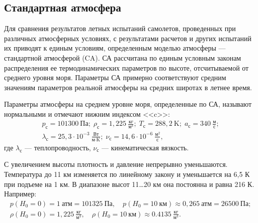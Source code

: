 	\subsection{Стандартная атмосфера}
	Для сравнения результатов летных испытаний самолетов, проведенных при различных атмосферных условиях, с результатами расчетов и других испытаний их приводят к единым условиям, определенным моделью атмосферы --- стандартной атмосферой (CA). СА рассчитана по единым условным законам распределения ее термодинамических параметров по высоте, отсчитываемой от среднего уровня моря. Параметры СА примерно соответствуют средним значениям параметров реальной атмосферы на средних широтах в летнее время.\par
	Параметры атмосферы на среднем уровне моря, определенные по СА, называют нормальными и отмечают нижним индексом <<c>>:
	\begin{gather*}
		p_\text{с}=101300\:\text{Па};\; \rho_\text{с}=1,225\:\frac{\text{кг}}{\text{м}^3};\; T_\text{с}=288,2\:\text{K};\; a_\text{с}=340\:\frac{\text{м}}{\text{с}};\\ \lambda_\text{с}=25,3\cdot10^{-3}\:\frac{\text{Вт}}{\text{м}\cdot\text{K}};\; \nu_\text{с}=14,6\cdot10^{-6}\:\frac{\text{м}^2}{\text{с}},
	\end{gather*}
	где $\lambda_\text{с}$ --- теплопроводность, $\nu_\text{с}$ --- кинематическая вязкость.\par
	С увеличением высоты плотность и давление непрерывно уменьшаются. Температура до 11 км изменяется по линейному закону и уменьшается на 6,5 К при подъеме на 1 км. В диапазоне высот 11\dots20 км она постоянна и равна 216 К. Например:
	\begin{gather*}
		p\left(H_0=0\right)=1\:\text{атм}=101325\:\text{Па},\quad
		p\left(H_0=10\:\text{км}\right)\approx0,265\:\text{атм}=26500\:\text{Па};\\
		\rho\left(H_0=0\right)=1,225\:\frac{\text{кг}}{\text{м}^3},\quad
		\rho\left(H_0=10\:\text{км}\right)\approx0.4135\:\frac{\text{кг}}{\text{м}^3}.
	\end{gather*}
	
